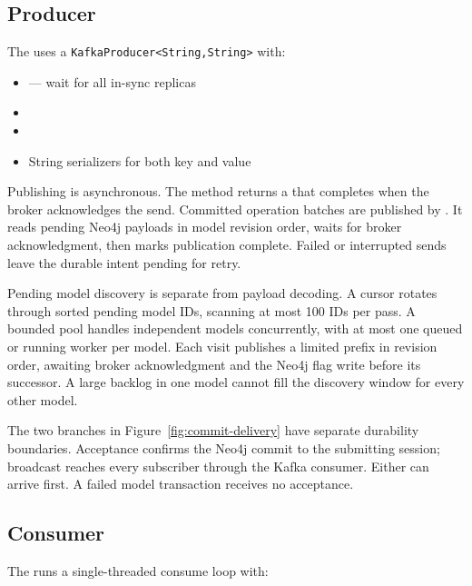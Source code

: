 \subsection{Producer}

The  uses a \texttt{KafkaProducer<String,{}String>}
with:

\begin{itemize}
\item {} --- wait for all in-sync replicas
\item {}
\item {}
\item String serializers for both key and value
\end{itemize}

Publishing is asynchronous. The  method returns a
 that completes when the broker acknowledges
the send. Committed operation batches are published by
. It reads pending Neo4j payloads in model
revision order, waits for broker acknowledgment, then marks publication complete.
Failed or interrupted sends leave the durable intent pending for retry.

Pending model discovery is separate from payload decoding. A cursor rotates
through sorted pending model IDs, scanning at most 100 IDs per pass. A bounded
pool handles independent models concurrently, with at most one queued or
running worker per model. Each visit publishes a limited prefix in revision
order, awaiting broker acknowledgment and the Neo4j flag write before its
successor. A large backlog in one model cannot fill the discovery window for
every other model.


The two branches in Figure~\ref{fig:commit-delivery} have separate durability
boundaries. Acceptance confirms the Neo4j commit to the submitting session;
broadcast reaches every subscriber through the Kafka consumer. Either can
arrive first. A failed model transaction receives no acceptance.

\subsection{Consumer}

The  runs a single-threaded consume loop with:

